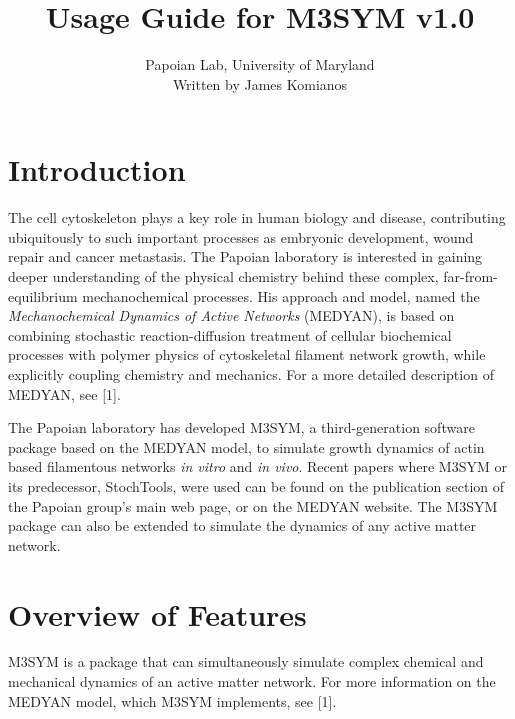 \documentclass[11pt, oneside]{article}   	%
\title{Usage Guide for M3SYM v1.0}
\author{Papoian Lab, University of Maryland \\ Written by James Komianos}
\date{}							%
\begin{document}
\maketitle



\tableofcontents

\newpage
\section {Introduction}

 The cell cytoskeleton plays a key role in human biology and disease, contributing ubiquitously
 to such important processes as embryonic development, wound repair and cancer 
 metastasis. The Papoian laboratory is interested in gaining deeper understanding of the
 physical chemistry behind these complex, far-from-equilibrium mechanochemical 
 processes. His approach and model, named the \textit{Mechanochemical Dynamics of Active Networks} 
 (MEDYAN), is based on combining stochastic reaction-diffusion treatment
 of cellular biochemical processes with polymer physics of cytoskeletal filament network 
 growth, while explicitly coupling chemistry and mechanics. For a more detailed description of MEDYAN, see [1].
 
 The Papoian laboratory has developed M3SYM, a third-generation software package based on the MEDYAN
 model, to simulate growth dynamics of actin based filamentous networks \textit{in vitro} and 
 \textit{in vivo}. Recent papers where M3SYM or its predecessor, StochTools, were used 
 can be found on the publication section of the Papoian group's main web page, or on the MEDYAN website. 
 The M3SYM package can also be extended to simulate the dynamics of any active matter network.

\section {Overview of Features}

M3SYM is a package that can simultaneously simulate complex chemical and mechanical dynamics
of an active matter network. For more information on the MEDYAN model, which M3SYM implements,
see [1].
\end{document}
